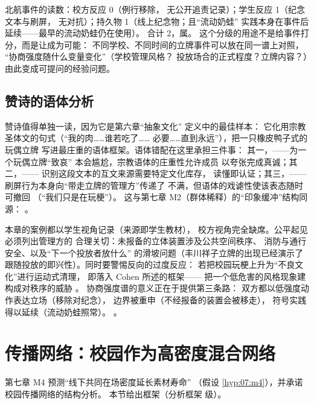 北航事件的读数：校方反应 0（例行移除，
无公开追责记录）；学生反应 1（纪念文本与刷屏，
无对抗）；持久物 1（线上纪念物；且“流动奶蛙”
实践本身在事件后延续——最早的流动奶蛙仍在使用）。
合计 2，属。
这个分级的用途不是给事件打分，而是让成为可能：
不同学校、不同时间的立牌事件可以放在同一谱上对照，
“协商强度随什么变量变化”（学校管理风格？
投放场合的正式程度？立牌内容？）由此变成可提问的经验问题。

\subsection{赞诗的语体分析}

赞诗值得单独一读，因为它是第六章“抽象文化”
定义中的最佳样本：
它化用宗教圣体文的句式（“我的肉……谁若吃了……
必要……直到永远”），把一只橡皮鸭子式的玩偶立牌
写进最庄重的语体框架。语体错配在这里承担三件事：
其一，——为一个玩偶立牌“致哀”
本会尴尬，宗教语体的庄重性允许成员
以夸张完成真诚；其二，——
识别这段文本的互文来源需要特定文化库存，
读懂即认证；其三，——
刷屏行为本身向“带走立牌的管理方”传递了
不满，但语体的戏谑性使该表态随时可撤回
（“我们只是在玩梗”）。
这与第七章 M2（群体稀释）的“印象缓冲”结构同源：
。

\begin{nlcritique}
  本章的案例都以学生视角记录（来源即学生教材），
  校方视角完全缺席。公平起见必须列出管理方的
  合理关切：未报备的立体装置涉及公共空间秩序、
  消防与通行安全、以及“下一个投放者放什么”
  的滑坡问题（丰川祥子立牌的出现已经演示了
  跟随投放的即兴性）。同时要警惕反向的过度反应：
  若把校园玩梗上升为“不良文化”进行运动式清理，
  即落入 Cohen 所述的框架——
  把一个低危害的风格现象建构成对秩序的威胁
  \cite{cohen1972folkdevils}。
  协商强度谱的意义正在于提供第三条路：
  双方都以低强度动作表达立场（移除对纪念），
  边界被重申（不经报备的装置会被移走），
  符号实践得以延续（流动奶蛙照常）。
  。
\end{nlcritique}

\section{传播网络：校园作为高密度混合网络}\label{sec:10:network}

第七章 M4 预测“线下共同在场密度延长素材寿命”
（假设 \ref{hyp:07:m4}），并承诺校园传播网络的结构分析。
本节给出框架（分析框架  级）。

